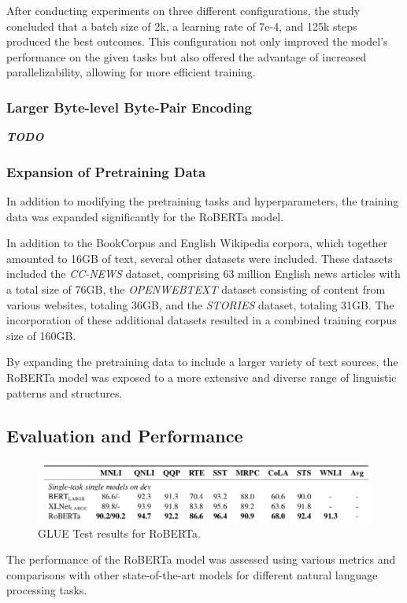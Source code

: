 \documentclass[a4paper,12pt]{report} %
\begin{document}
After conducting experiments on three different configurations, the study concluded that a batch size of 2k, a learning rate of 7e-4, and 125k steps produced the best outcomes. This configuration not only improved the model's performance on the given tasks but also offered the advantage of increased parallelizability, allowing for more efficient training.

\subsubsection{Larger Byte-level Byte-Pair Encoding}
\textit{\textbf{TODO}}

\subsubsection{Expansion of Pretraining Data}
In addition to modifying the pretraining tasks and hyperparameters, the training data was expanded significantly for the RoBERTa model.

In addition to the BookCorpus and English Wikipedia corpora, which together amounted to 16GB of text, several other datasets were included. These datasets included the \textit{CC-NEWS} dataset, comprising 63 million English news articles with a total size of 76GB, the \textit{OPENWEBTEXT} dataset consisting of content from various websites, totaling 36GB, and the \textit{STORIES} dataset, totaling 31GB. The incorporation of these additional datasets resulted in a combined training corpus size of 160GB.

By expanding the pretraining data to include a larger variety of text sources, the RoBERTa model was exposed to a more extensive and diverse range of linguistic patterns and structures.

\subsection{Evaluation and Performance}
\begin{figure}
  \centering
  \includegraphics[width=12cm]{img/roberta_results.png}
  \caption{GLUE Test results for RoBERTa.}
  \label{fig:roberta_results}
\end{figure}
The performance of the RoBERTa model was assessed using various metrics and comparisons with other state-of-the-art models for different natural language processing tasks.
\end{document}
